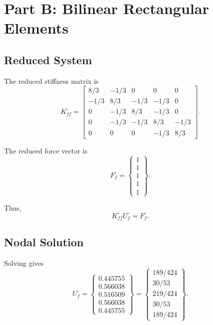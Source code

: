 \documentclass[14pt,a4paper]{article}
\newcommand{\vect}[1]{\begin{Bmatrix}#1\end{Bmatrix}}
\newcommand{\mat}[1]{\begin{bmatrix}#1\end{bmatrix}}
\begin{document}
\section{Part B: Bilinear Rectangular Elements}

\subsection{Reduced System}

The reduced stiffness matrix is
\begin{equation}
K_{ff}^{\square}=\mat{
8/3 & -1/3 & 0 & 0 & 0\\
-1/3 & 8/3 & -1/3 & -1/3 & 0\\
0 & -1/3 & 8/3 & -1/3 & 0\\
0 & -1/3 & -1/3 & 8/3 & -1/3\\
0 & 0 & 0 & -1/3 & 8/3
}.
\end{equation}

The reduced force vector is
\begin{equation}
F_f^{\square}=\vect{1\\1\\1\\1\\1}.
\end{equation}

Thus,
\begin{equation}
K_{ff}^{\square}U_f^{\square}=F_f^{\square}.
\end{equation}

\subsection{Nodal Solution}

Solving gives
\begin{equation}
U_f^{\square}=\vect{
0.445755\\
0.566038\\
0.516509\\
0.566038\\
0.445755
}
=
\vect{
189/424\\
30/53\\
219/424\\
30/53\\
189/424
}.
\end{equation}
\end{document}
